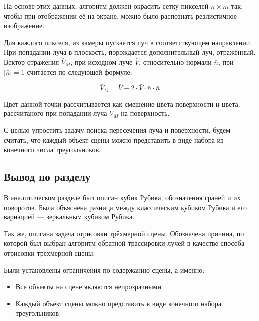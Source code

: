 На основе этих данных, алгоритм должен окрасить сетку пикселей $n\times m$ так, чтобы при отображении её на экране, можно было распознать реалистичное изображение.

Для каждого пикселя, из камеры пускается луч в соответствующем направлении. При попадании луча в плоскость, порождается дополнительный луч, отражённый. Вектор отражения $\bar V_M$, при исходном луче $\bar V$, относительно нормали $\bar n$, при $|\bar n| = 1$ считается по следующей формуле:

\begin{equation}
	\bar V_M = \bar V - 2\cdot\bar V \cdot\bar n\cdot\bar n
	\label{eq:bounce}
\end{equation}

Цвет данной точки рассчитывается как смешение цвета поверхности и цвета, рассчитаного при попадании луча $\bar V_M$ на поверхность.

С целью упростить задачу поиска пересечения луча и поверхности, будем считать, что каждый объект сцены можно представить в виде набора из конечного числа треугольников.

\subsection{Вывод по разделу}
В аналитическом разделе был описан кубик Рубика, обозначения граней и их поворотов. Была объяснена разница между классическим кубиком Рубика и его вариацией --- зеркальным кубиком Рубика.

Так же, описана задача отрисовки трёхмерной сцены. Обозначена причина, по которой был выбран алгоритм обратной трассировки лучей в качестве способа отрисовки трёхмерной сцены.

Были установлены ограничения по содержанию сцены, а именно:
\begin{itemize}
	\item Все объекты на сцене являются непрозрачными
	\item Каждый объект сцены можно представить в виде конечного набора треугольников
\end{itemize}

